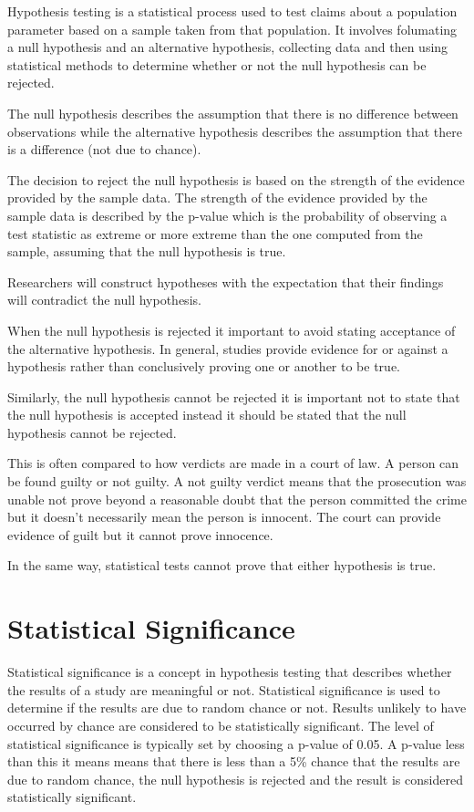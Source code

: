 \documentclass[
]{book}
\begin{document}
Hypothesis testing is a statistical process used to test claims about a population parameter based on a sample taken from that population. It involves folumating a null hypothesis and an alternative hypothesis, collecting data and then using statistical methods to determine whether or not the null hypothesis can be rejected.

The null hypothesis describes the assumption that there is no difference between observations while the alternative hypothesis describes the assumption that there is a difference (not due to chance).

The decision to reject the null hypothesis is based on the strength of the evidence provided by the sample data. The strength of the evidence provided by the sample data is described by the p-value which is the probability of observing a test statistic as extreme or more extreme than the one computed from the sample, assuming that the null hypothesis is true.

Researchers will construct hypotheses with the expectation that their findings will contradict the null hypothesis.

When the null hypothesis is rejected it important to avoid stating acceptance of the alternative hypothesis. In general, studies provide evidence for or against a hypothesis rather than conclusively proving one or another to be true.

Similarly, the null hypothesis cannot be rejected it is important not to state that the null hypothesis is accepted instead it should be stated that the null hypothesis cannot be rejected.

This is often compared to how verdicts are made in a court of law. A person can be found guilty or not guilty. A not guilty verdict means that the prosecution was unable not prove beyond a reasonable doubt that the person committed the crime but it doesn't necessarily mean the person is innocent. The court can provide evidence of guilt but it cannot prove innocence.

In the same way, statistical tests cannot prove that either hypothesis is true.

\hypertarget{statistical-significance}{%
\section{Statistical Significance}\label{statistical-significance}}

Statistical significance is a concept in hypothesis testing that describes whether the results of a study are meaningful or not. Statistical significance is used to determine if the results are due to random chance or not. Results unlikely to have occurred by chance are considered to be statistically significant. The level of statistical significance is typically set by choosing a p-value of 0.05. A p-value less than this it means means that there is less than a 5\% chance that the results are due to random chance, the null hypothesis is rejected and the result is considered statistically significant.
\end{document}
